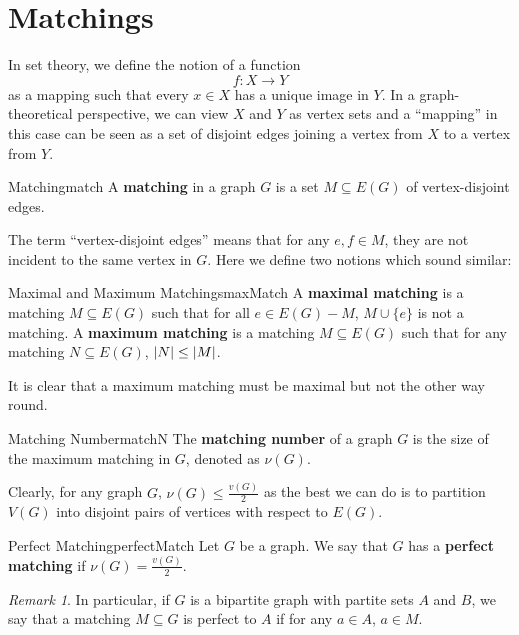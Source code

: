 \documentclass[math]{amznotes}
\theoremstyle{remark}
\newtheorem*{remark}{Remark}
\begin{document}
\section{Matchings}
In set theory, we define the notion of a function
\begin{equation*}
    f \colon X \to Y
\end{equation*}
as a mapping such that every $x \in X$ has a unique image in $Y$. In a graph-theoretical perspective, we can view $X$ and $Y$ as vertex sets and a ``mapping'' in this case can be seen as a set of disjoint edges joining a vertex from $X$ to a vertex from $Y$.
\begin{dfnbox}{Matching}{match}
    A {\color{red} \textbf{matching}} in a graph $G$ is a set $M \subseteq E(G)$ of vertex-disjoint edges.
\end{dfnbox}
The term ``vertex-disjoint edges'' means that for any $e, f \in M$, they are not incident to the same vertex in $G$. Here we define two notions which sound similar:
\begin{dfnbox}{Maximal and Maximum Matchings}{maxMatch}
    A {\color{red} \textbf{maximal matching}} is a matching $M \subseteq E(G)$ such that for all $e \in E(G) - M$, $M \cup \{e\}$ is not a matching. A {\color{red} \textbf{maximum matching}} is a matching $M \subseteq E(G)$ such that for any matching $N \subseteq E(G)$, ${\left\lvert {N} \right\rvert} \leq {\left\lvert {M} \right\rvert}$.
\end{dfnbox}
It is clear that a maximum matching must be maximal but not the other way round.
\begin{dfnbox}{Matching Number}{matchN}
    The {\color{red} \textbf{matching number}} of a graph $G$ is the size of the maximum matching in $G$, denoted as $\nu(G)$.
\end{dfnbox}
Clearly, for any graph $G$, $\nu(G) \leq \frac{v(G)}{2}$ as the best we can do is to partition $V(G)$ into disjoint pairs of vertices with respect to $E(G)$.
\begin{dfnbox}{Perfect Matching}{perfectMatch}
    Let $G$ be a graph. We say that $G$ has a {\color{red} \textbf{perfect matching}} if $\nu(G) = \frac{v(G)}{2}$.
\end{dfnbox}
\begin{notebox}
    \begin{remark}
        In particular, if $G$ is a bipartite graph with partite sets $A$ and $B$, we say that a matching $M \subseteq G$ is perfect to $A$ if for any $a \in A$, $a \in M$.
    \end{remark}
\end{notebox}
\end{document}
